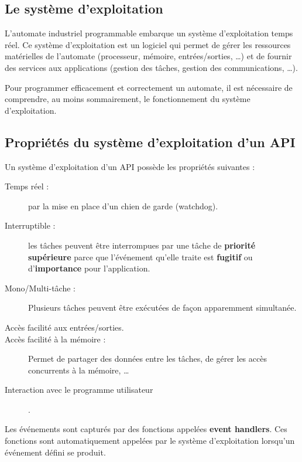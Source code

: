 
\subsection{Le système d'exploitation}
L'automate industriel programmable embarque un système d'exploitation temps réel. Ce système d'exploitation est un logiciel qui permet de gérer les ressources matérielles de l'automate (processeur, mémoire, entrées/sorties, \dots) et de fournir des services aux applications (gestion des tâches, gestion des communications, \dots). 

Pour programmer efficacement et correctement un automate, il est nécessaire de comprendre, au moins sommairement, le fonctionnement du système d'exploitation.


\subsection{Propriétés du système d'exploitation d'un API}
Un système d'exploitation d'un API possède les propriétés suivantes : 
\begin{description}
    \item[Temps réel : ] par la mise en place d'un chien de garde (watchdog).
    \item[Interruptible : ] les tâches peuvent être interrompues par une tâche de \textbf{priorité supérieure} parce que l'événement qu'elle traite est \textbf{fugitif} ou d'\textbf{importance} pour l'application.
    \item[Mono/Multi-tâche : ] Plusieurs tâches peuvent être exécutées de façon apparemment simultanée.  
    \item[Accès facilité aux entrées/sorties.]
    \item[Accès facilité à la mémoire : ] Permet de partager des données entre les tâches, de gérer les accès concurrents à la mémoire, \dots
    \item[Interaction avec le programme utilisateur]. 
\end{description}

Les événements sont capturés par des fonctions appelées \textbf{event handlers}. Ces fonctions sont automatiquement appelées par le système d'exploitation lorsqu'un événement défini se produit.


